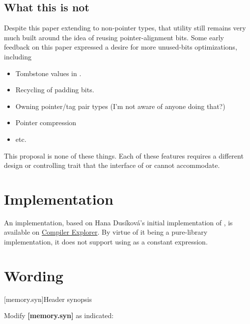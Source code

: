 \documentclass{wg21}
\newcommand{\editinstr}[1]{\textcolor{noteclr}{#1}}
\begin{document}
\subsection{What this is not}

Despite this paper extending  to non-pointer types, that utility still remains very much built around
the idea of reusing pointer-alignment bits.
Some early feedback on this paper expressed a desire for more unused-bits optimizations, including

\begin{itemize}
\item Tombstone values in .
\item Recycling of padding bits.
\item Owning pointer/tag pair types (I'm not aware of anyone doing that?)
\item Pointer compression
\item etc.
\end{itemize}

This proposal is none of these things. Each of these features requires a different design or controlling trait that the
interface of  or  cannot accommodate.


\section{Implementation}

An implementation, based on Hana Dusíková's initial implementation of , is available on
\href{https://compiler-explorer.com/z/or19xf7jM}{Compiler Explorer}. By virtue of it being a pure-library implementation,
it does not support using  as a constant expression.

\section{Wording}

[memory.syn]{Header  synopsis}

\editinstr{Modify \textbf{[memory.syn]} as indicated:}
\end{document}
